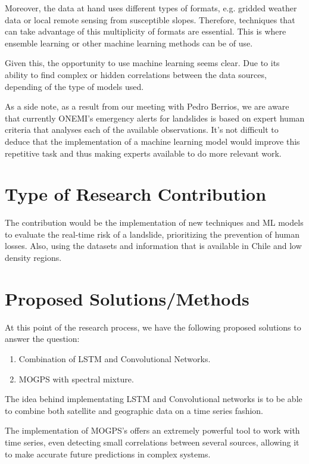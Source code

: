 \documentclass[sigconf, nonacm]{acmart}
\begin{document}
Moreover, the data at hand uses different types of formats, e.g. gridded weather data or local remote sensing from susceptible slopes. Therefore, techniques that can take advantage of this multiplicity of formats are essential. This is where ensemble learning \cite{ensembles} or other machine learning methods \cite{other_data_fusion} can be of use. 

Given this, the opportunity to use machine learning seems clear. Due to its ability to find complex or hidden correlations between the data sources, depending of the type of models used. 

As a side note, as a result from our meeting with Pedro Berrios, we are aware that currently ONEMI's emergency alerts for landslides is based on expert human criteria that analyses each of the available observations. It's not difficult to deduce that the implementation of a machine learning model would improve this repetitive task and thus making experts available to do more relevant work. %


\section{Type of Research Contribution}

The contribution would be the implementation of new techniques and ML models to evaluate the real-time risk of a landslide, prioritizing the prevention of human losses. Also, using the datasets and information that is available in Chile and low density regions.  %


\section{Proposed Solutions/Methods}

At this point of the research process, we have the following proposed solutions to answer the question: %

\begin{enumerate}
    \item Combination of LSTM and Convolutional Networks.
    \item MOGPS with spectral mixture.
\end{enumerate}

The idea behind implementating  LSTM and Convolutional networks is to be able to combine both satellite and geographic data on a time series fashion.  

The implementation of MOGPS's offers an extremely powerful tool to work with time series, even detecting small correlations between several sources, allowing it to make accurate future predictions in complex systems. 
\end{document}

